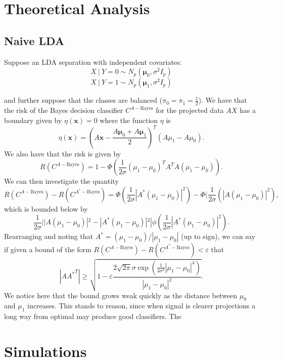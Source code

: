 \documentclass[12pt]{article}
\begin{document}
\section{Theoretical Analysis}

\citep{paulin_efronstein_2016}

\subsection{Naive LDA }
Suppose an LDA separation with independent covariates:
$$X\ | \ Y = 0 \sim N_p(\mathbf{\mu}_0, \sigma^2 I_p) $$
$$X\ | \ Y= 1 \sim N_p(\mathbf{\mu}_1,  \sigma^2 I_p) $$

and further suppose that the classes are balanced ($\pi_0 = \pi_1 = \frac{1}{2}$). We have that the risk of the Bayes decision classifier $C^{A-\mathrm{Bayes}}$ for the projected data $AX$ has a boundary given by $\eta(\mathbf{x}) = 0$ where the function $\eta$ is
$$\eta(\mathbf{x}) = (A\mathbf{x} - \frac{A\mathbf{\mu}_0 + A\mathbf{\mu}_1}{2})^T(A\mu_1 - A\mu_0).$$
We also have that the risk is given by 
$$R(C^{A-\mathrm{Bayes}}) = 1 - \Phi(\frac{1}{2\sigma}(\mu_1 - \mu_0)^TA^TA(\mu_1 - \mu_0)).$$
We can then investigate the quantity 
$$R(C^{A-\mathrm{Bayes}}) - R(C^{A^*-\mathrm{Bayes}}) = \Phi (\frac{1}{2\sigma} |A^*(\mu_1 - \mu_0)|^2) - \Phi(\frac{1}{2\sigma}(|A(\mu_1-\mu_0)|^2),$$
which is bounded below by 
$$\frac{1}{2\sigma}||A(\mu_1 - \mu_0)|^2 - |A^*(\mu_1 - \mu_0)|^2|\phi(\frac{1}{2\sigma}|A^*(\mu_1 - \mu_0)|^2). $$
Rearranging and noting that $A^* = (\mu_1 - \mu_0)/|\mu_1 - \mu_0|$ (up to sign), we can say if given a bound of the form $R(C^{A-\mathrm{Bayes}}) - R(C^{A^*-\mathrm{Bayes}}) < \varepsilon$ that 
$$|A{A^*}^T| \geq \sqrt{1 - \varepsilon \frac{2\sqrt{2\pi}\sigma\exp(\frac{1}{4\sigma^2}|\mu_1 - \mu_0|^4)}{|\mu_1 - \mu_0|^2}}. $$
We notice here that the bound grows weak quickly as the distance between $\mu_0$ and $\mu_1$ increases. This stands to reason, since when signal is clearer projections a long way from optimal may produce good classifiers. The 

\section{Simulations}
\end{document}

